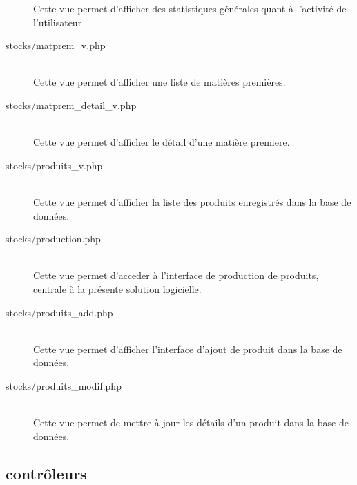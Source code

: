 \begin{description}
                Cette vue permet d'afficher des statistiques générales quant
                à l'activité de l'utilisateur
            \item[stocks/matprem\_v.php]\hfill \\
                Cette vue permet d'afficher une liste de matières premières.
            \item[stocks/matprem\_detail\_v.php]\hfill \\
                Cette vue permet d'afficher le détail d'une matière premiere.
            \item[stocks/produits\_v.php]\hfill \\
                Cette vue permet d'afficher la liste des produits enregistrés
                dans la base de données.
            \item[stocks/production.php]\hfill \\
                Cette vue permet d'acceder à l'interface de production de
                produits, centrale à la présente solution logicielle.
            \item[stocks/produits\_add.php]\hfill \\
                Cette vue permet d'afficher l'interface d'ajout de produit
                dans la base de données.
            \item[stocks/produits\_modif.php]\hfill \\
                Cette vue permet de mettre à jour les détails d'un produit
                dans la base de données.
        \end{description}

    \subsection{contrôleurs}
